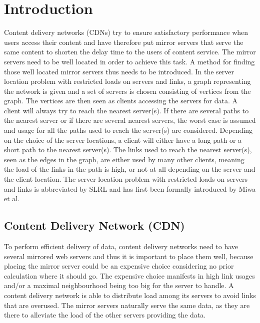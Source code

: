 \documentclass [12pt]{article}
\begin{document}
\thispagestyle{empty}

\newpage
\tableofcontents
\newpage


\section{Introduction}
Content delivery networks (CDNs) try to ensure satisfactory performance when users access their content 
and have therefore put mirror servers that serve the same content to shorten the delay time to the users of content service.
The mirror servers need to be well located in order to achieve this task. A method for finding those well located mirror servers thus needs to be introduced.
In the server location problem with restricted loads on servers and links, a graph representing the network is given and a set of servers is chosen consisting of vertices from the graph. The vertices are then seen as clients
accessing the servers for data. A client will always try to reach the nearest server(s). If there are several paths to the nearest server or if there are several nearest servers, the worst case is assumed
and usage for all the paths used to reach the server(s) are considered.
Depending on the choice of the server locations, a client will either have a long path or a short path to the nearest server(s). The links used to reach the nearest server(s), seen as the edges in the graph,
are either used by many other clients, meaning the load of the links in the path is high, or not at all depending on the server and the client location. The server location problem with restricted loads
on servers and links is abbreviated by SLRL and has first been formally introduced by Miwa et al. \cite{mirrorserver}

\subsection {Content Delivery Network (CDN)}
To perform efficient delivery of data, content delivery networks need to have several mirrored web servers
and thus it is important to place them well, because placing the mirror server 
could be an expensive choice considering no prior calculation where it should go. 
The expensive choice manifests in high link usages and/or a maximal neighbourhood being
too big for the server to handle. A content delivery network is able to distribute load among its servers to avoid
links that are overused.
The mirror servers naturally serve the same data, as they are there to alleviate the 
load of the other servers providing the data.
\end{document}
